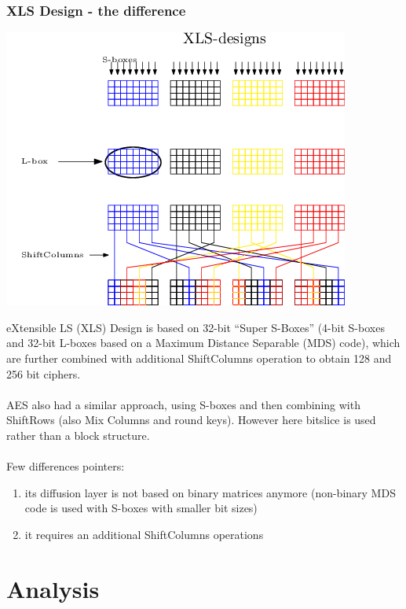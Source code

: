 \documentclass[preprint]{transcrypto}
\begin{document}
\subsubsection{XLS Design - the difference}
\begin{center}
    \includegraphics[]{xls.png} 
\end{center}
eXtensible LS (XLS) Design is based on 32-bit “Super S-Boxes” (4-bit S-boxes and 32-bit L-boxes based on a Maximum Distance Separable (MDS) code), which are further combined with additional ShiftColumns operation to obtain 128 and 256 bit ciphers. 
\\\\
AES also had a similar approach, using S-boxes and then combining with ShiftRows (also Mix Columns and round keys). However here bitslice is used rather than a block structure.
\\\\
Few differences pointers:
\begin{enumerate}
    \item its diffusion layer is not based on binary matrices anymore (non-binary MDS code is used with S-boxes with smaller bit sizes)
    \item it requires an additional ShiftColumns operations
\end{enumerate}

\section{Analysis}
\end{document}
